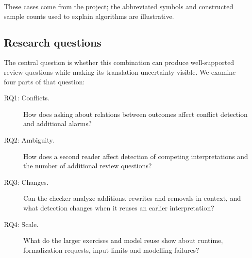 These cases come from the project; the abbreviated symbols and constructed sample counts used to explain algorithms are illustrative.


\subsection{Research questions}

The central question is whether this combination can produce well-supported review questions while making its translation uncertainty visible. We examine four parts of that question:

\begin{description}
\item[RQ1: Conflicts.] How does asking about relations between outcomes affect conflict detection and additional alarms?
\item[RQ2: Ambiguity.] How does a second reader affect detection of competing interpretations and the number of additional review questions?
\item[RQ3: Changes.] Can the checker analyze additions, rewrites and removals in context, and what detection changes when it reuses an earlier interpretation?
\item[RQ4: Scale.] What do the larger exercises and model reuse show about runtime, formalization requests, input limits and modelling failures?
\end{description}

